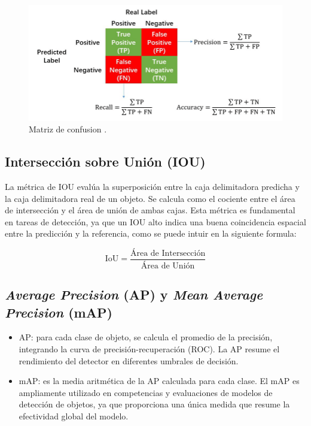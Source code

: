 \begin{figure}[htpb]
	\centering
	\includegraphics[scale=0.5]{./Figures/precision-recall-accuracy.png}
	\caption{Matriz de confusion \protect\footnotemark.}
	\label{fig:presicion-recall-accuracy}
\end{figure}


\subsection{Intersección sobre Unión (IOU)}

La métrica de IOU evalúa la superposición entre la caja delimitadora predicha y la caja delimitadora real de un objeto. Se calcula como el cociente entre el área de intersección y el área de unión de ambas cajas. Esta métrica es fundamental en tareas de detección, ya que un IOU alto indica una buena coincidencia espacial entre la predicción y la referencia, como se puede intuir en la siguiente formula:

\begin{equation}
	\text{IoU} = \frac{\text{Área de Intersección}}{\text{Área de Unión}}
	\label{eq:iou}
\end{equation}

\subsection{\textit{Average Precision} (AP) y \textit{Mean Average Precision} (mAP)}

\begin{itemize}
	\item AP: para cada clase de objeto, se calcula el promedio de la precisión, integrando la curva de precisión-recuperación (ROC). La AP resume el rendimiento del detector en diferentes umbrales de decisión.
	\item mAP: es la media aritmética de la AP calculada para cada clase. El mAP es ampliamente utilizado en competencias y evaluaciones de modelos de detección de objetos, ya que proporciona una única medida que resume la efectividad global del modelo.
\end{itemize}

